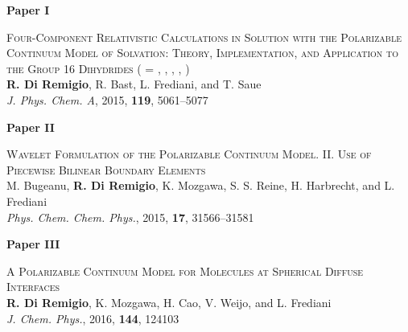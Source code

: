 \thispagestyle{empty}
\vspace*{\fill}
\begin{flushright}
\Huge{\textbf{Paper I}}
\end{flushright}

\Large{
\textsc{Four-Component Relativistic Calculations in Solution with the
Polarizable Continuum Model of Solvation: Theory,
Implementation, and Application to the
Group 16 Dihydrides
 ( = , , , ,
    )}
\\
\textbf{R. Di Remigio}, R. Bast, L. Frediani, and T. Saue
\\
\textit{J. Phys. Chem. A}, \textrm{2015}, \textbf{119}, 5061--5077
}
\vspace*{\fill}



\thispagestyle{empty}
\vspace*{\fill}
\begin{flushright}
\Huge{\textbf{Paper II}}
\end{flushright}

\Large{
\textsc{
Wavelet Formulation of the Polarizable Continuum Model. II. Use of Piecewise
Bilinear Boundary Elements
}
\\
M. Bugeanu, \textbf{R. Di Remigio}, K. Mozgawa, S. S. Reine, H.
Harbrecht,  and L. Frediani
\\
\textit{Phys. Chem. Chem. Phys.}, \textrm{2015}, \textbf{17},
31566--31581
}
\vspace*{\fill}



\thispagestyle{empty}
\vspace*{\fill}
\begin{flushright}
\Huge{\textbf{Paper III}}
\end{flushright}

\Large{
\textsc{
    A Polarizable Continuum Model for Molecules at Spherical
    Diffuse Interfaces
}
\\
    \textbf{R. Di Remigio}, K. Mozgawa, H. Cao, V. Weijo, and L.
    Frediani
\\
    \textit{J. Chem. Phys.}, \textrm{2016}, \textbf{144}, 124103
}
\vspace*{\fill}

